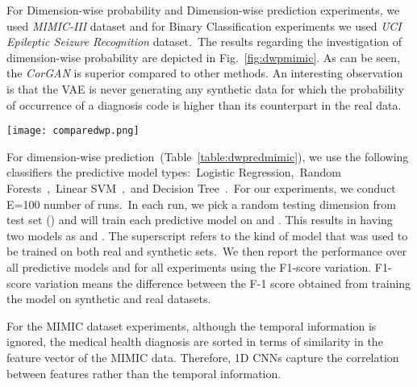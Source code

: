 \documentclass[letterpaper]{article} \usepackage{aaai20}  \usepackage{times}  \usepackage{helvet} \usepackage{courier}  \usepackage[hyphens]{url}  \usepackage{graphicx} \urlstyle{rm} \def\UrlFont{\rm}  \usepackage{graphicx}  \frenchspacing  \setlength{\pdfpagewidth}{8.5in}  \setlength{\pdfpageheight}{11in}
\begin{document}
For Dimension-wise probability and Dimension-wise prediction experiments, we used \textit{MIMIC-III} dataset and for Binary Classification experiments we used \textit{UCI Epileptic Seizure Recognition} dataset.~The results regarding the investigation of dimension-wise probability are depicted in Fig.~\ref{fig:dwpmimic}. As can be seen, the \textit{CorGAN} is superior compared to other methods. An interesting observation is that the VAE is never generating any synthetic data for which the probability of occurrence of a diagnosis code is higher than its counterpart in the real data.

\begin{figure*}
\centering
    \texttt{[image: comparedwp.png]}
    \caption[]{he scatter plots of dimension-wise probability. Each point depicts one of 1071 unique diagnosis codes. The x-axis and y-axis represent the Bernoulli success probability for real and synthetic datasets, respectively. The diagonal line shows the ideal case.} \label{fig:dwpmimic}
\end{figure*}

For dimension-wise prediction~(Table~\ref{table:dwpredmimic}), we use the following classifiers the predictive model types:~Logistic Regression,~Random Forests~\cite{breiman2001random},~Linear SVM~\cite{cortes1995support},~and Decision Tree~\cite{quinlan1986induction}.~For our experiments, we conduct E=100 number of runs.~In each run, we pick a random testing dimension from test set () and will train each predictive model on  and . This results in having two models as  and . The superscript refers to the kind of model that was used to be trained on both real and synthetic sets.~We then report the performance over all predictive models and for all experiments using the F1-score variation. F1-score variation means the difference between the F-1 score obtained from training the model on synthetic and real datasets. 

For the MIMIC dataset experiments, although the temporal information is ignored, the medical health diagnosis are sorted in terms of similarity in the feature vector of the MIMIC data. Therefore, 1D CNNs capture the correlation between features rather than the temporal information. 




\begin{table}[t]
\caption{Comparison of different baseline architectures. The reported metric demonstrate the mean and standard deviation of the F-1 score differences. A better model has a closer score to zero.}\smallskip
\centering
{}
\label{table:dwpredmimic}
\end{table}
\end{document}

